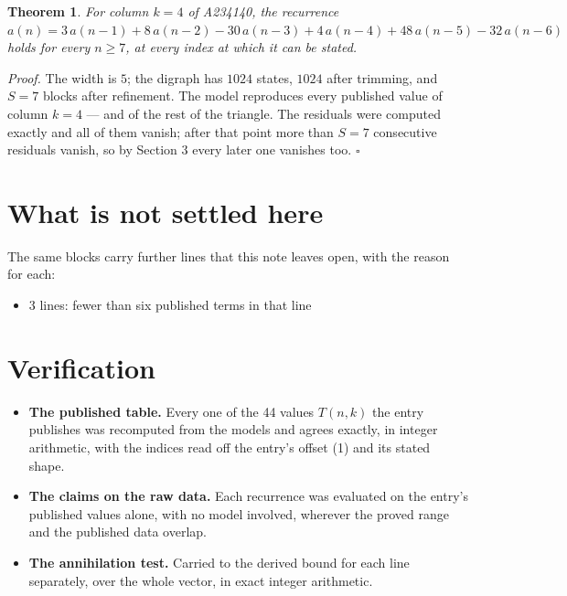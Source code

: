\documentclass[11pt]{article}
\newtheorem{theorem}{Theorem}
\theoremstyle{definition}
\begin{document}
\begin{theorem} For column $k = 4$ of A234140, the recurrence $a(n) = 3\,a(n-1) + 8\,a(n-2) - 30\,a(n-3) + 4\,a(n-4) + 48\,a(n-5) - 32\,a(n-6)$ holds for every $n \ge 7$, at every index at which it can be stated.\end{theorem}

{\itshape Proof.} The width is $5$; the digraph has $1024$ states, $1024$ after trimming, and $S = 7$ blocks after refinement. The model reproduces every published value of column $k = 4$ --- and of the rest of the triangle. The residuals were computed exactly and all of them vanish; after that point more than $S = 7$ consecutive residuals vanish, so by Section 3 every later one vanishes too. $\square$

\section{What is not settled here}

The same blocks carry further lines that this note leaves open, with the reason for each:

\begin{itemize}

\item 3 lines: fewer than six published terms in that line

\end{itemize}

\section{Verification}

\begin{itemize}

\item {\bfseries The published table.} Every one of the 44 values $T(n,k)$ the entry publishes was recomputed from the models and agrees exactly, in integer arithmetic, with the indices read off the entry's offset (1) and its stated shape.

\item {\bfseries The claims on the raw data.} Each recurrence was evaluated on the entry's published values alone, with no model involved, wherever the proved range and the published data overlap.

\item {\bfseries The annihilation test.} Carried to the derived bound for each line separately, over the whole vector, in exact integer arithmetic.

\end{itemize}
\end{document}
